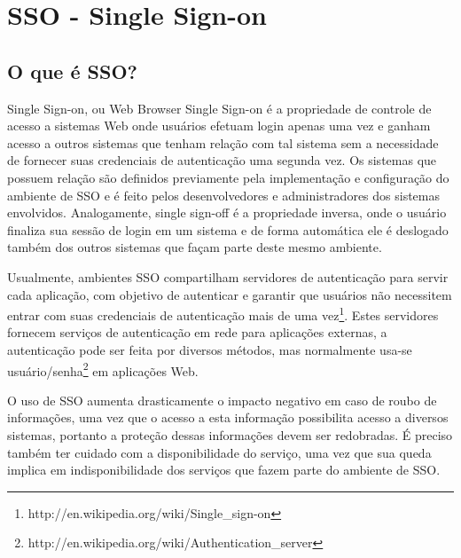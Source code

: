 \documentclass[11pt]{article}
\begin{document}
\lstset{language=Ruby}


\clearpage

\clearpage

\tableofcontents
\clearpage
\listoffigures

\clearpage



\section{SSO - Single Sign-on}

\subsection{O que é SSO?}

Single Sign-on, ou Web Browser Single Sign-on é a propriedade de controle de
acesso a sistemas Web onde usuários efetuam login apenas uma vez e ganham acesso a
outros sistemas que tenham relação com tal sistema sem a necessidade de fornecer
suas credenciais de autenticação uma segunda vez. Os sistemas que possuem
relação são definidos previamente pela implementação e configuração do
ambiente de SSO e é feito pelos desenvolvedores e administradores dos sistemas envolvidos.
Analogamente, single sign-off é a propriedade inversa, onde o usuário finaliza
sua sessão de login em um sistema e de forma automática ele é deslogado também
dos outros sistemas que façam parte deste mesmo ambiente.

Usualmente, ambientes SSO compartilham servidores de autenticação para servir
cada aplicação, com objetivo de autenticar e garantir que usuários não
necessitem entrar com suas credenciais de autenticação mais de uma
vez\footnote{http://en.wikipedia.org/wiki/Single\_sign-on}. Estes servidores
fornecem serviços de autenticação em rede para aplicações externas, a
autenticação pode ser feita por diversos métodos, mas normalmente usa-se
usuário/senha\footnote{http://en.wikipedia.org/wiki/Authentication\_server} em
aplicações Web.

O uso de SSO aumenta drasticamente o impacto negativo em caso de roubo de
informações, uma vez que o acesso a esta informação possibilita acesso a
diversos sistemas, portanto a proteção dessas informações devem ser redobradas.
É preciso também ter cuidado com a disponibilidade do serviço, uma vez
que sua queda implica em indisponibilidade dos serviços que fazem parte do
ambiente de SSO.
\end{document}
